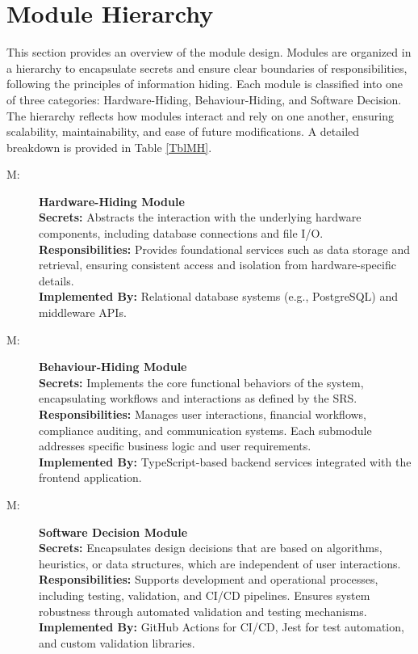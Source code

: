 \documentclass[12pt, titlepage]{article}
\newcounter{mnum}
\newcommand{\mthemnum}{M\themnum}
\begin{document}
\section{Module Hierarchy} \label{SecMH}

This section provides an overview of the module design. Modules are organized in a hierarchy to encapsulate secrets and ensure clear boundaries of responsibilities, following the principles of information hiding. Each module is classified into one of three categories: Hardware-Hiding, Behaviour-Hiding, and Software Decision. The hierarchy reflects how modules interact and rely on one another, ensuring scalability, maintainability, and ease of future modifications. A detailed breakdown is provided in Table \ref{TblMH}.

\begin{description}
\item [ \mthemnum \label{mHH}:] 
\textbf{Hardware-Hiding Module} \\
\textbf{Secrets:} Abstracts the interaction with the underlying hardware components, including database connections and file I/O.\\
\textbf{Responsibilities:} Provides foundational services such as data storage and retrieval, ensuring consistent access and isolation from hardware-specific details.\\
\textbf{Implemented By:} Relational database systems (e.g., PostgreSQL) and middleware APIs.

\item [ \mthemnum \label{mBH}:] 
\textbf{Behaviour-Hiding Module} \\
\textbf{Secrets:} Implements the core functional behaviors of the system, encapsulating workflows and interactions as defined by the SRS.\\
\textbf{Responsibilities:} Manages user interactions, financial workflows, compliance auditing, and communication systems. Each submodule addresses specific business logic and user requirements.\\
\textbf{Implemented By:} TypeScript-based backend services integrated with the frontend application.

\item [ \mthemnum \label{mSD}:] 
\textbf{Software Decision Module} \\
\textbf{Secrets:} Encapsulates design decisions that are based on algorithms, heuristics, or data structures, which are independent of user interactions.\\
\textbf{Responsibilities:} Supports development and operational processes, including testing, validation, and CI/CD pipelines. Ensures system robustness through automated validation and testing mechanisms.\\
\textbf{Implemented By:} GitHub Actions for CI/CD, Jest for test automation, and custom validation libraries.
\end{description}
\end{document}
